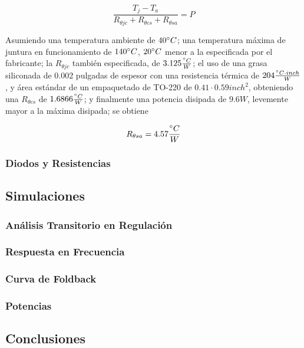 \begin{equation}
\frac{T_j - T_a}{R_{\theta jc}+R_{\theta cs}+R_{\theta sa}} = P
\end{equation}

Asumiendo una temperatura ambiente de $40\degree C$; una temperatura máxima de juntura en funcionamiento de $140\degree C$, $20\degree C$ menor a la especificada por el fabricante; la $R_{\theta jc}$ también especificada, de $3.125\frac{\degree C}{W}$; el uso de una grasa siliconada de 0.002 pulgadas de espesor con una resistencia térmica de $204\frac{\degree C \cdot inch}{W}$, y área estándar de un empaquetado de TO-220 de $0.41\cdot 0.59 inch^2$, obteniendo una $R_{\theta cs}$ de $1.6866 \frac{\degree C}{W}$; y finalmente una potencia disipada de $9.6W$, levemente mayor a la máxima disipada; se obtiene

\begin{equation}
R_{\theta sa} = 4.57 \frac{\degree C}{W}
\end{equation}

\subsubsection{Diodos y Resistencias}

\subsection{Simulaciones}
\subsubsection{Análisis Transitorio en Regulación}
\subsubsection{Respuesta en Frecuencia}
\subsubsection{Curva de Foldback}
\subsubsection{Potencias}

\subsection{Conclusiones}












